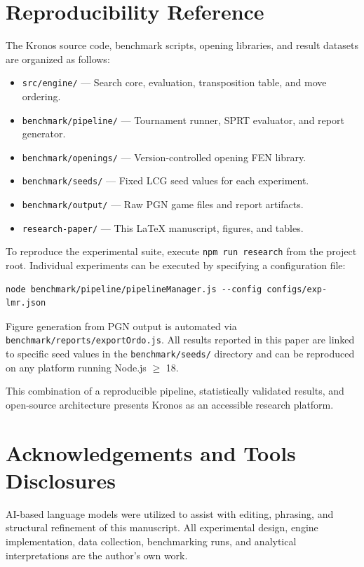 \section{Reproducibility Reference}
The Kronos source code, benchmark scripts, opening libraries, and result datasets are organized as follows:
\begin{itemize}
    \item \texttt{src/engine/} — Search core, evaluation, transposition table, and move ordering.
    \item \texttt{benchmark/pipeline/} — Tournament runner, SPRT evaluator, and report generator.
    \item \texttt{benchmark/openings/} — Version-controlled opening FEN library.
    \item \texttt{benchmark/seeds/} — Fixed LCG seed values for each experiment.
    \item \texttt{benchmark/output/} — Raw PGN game files and report artifacts.
    \item \texttt{research-paper/} — This \LaTeX{} manuscript, figures, and tables.
\end{itemize}

To reproduce the experimental suite, execute \texttt{npm run research} from the project root. Individual experiments can be executed by specifying a configuration file:
\begin{verbatim}
node benchmark/pipeline/pipelineManager.js --config configs/exp-lmr.json
\end{verbatim}
Figure generation from PGN output is automated via \texttt{benchmark/reports/exportOrdo.js}. All results reported in this paper are linked to specific seed values in the \texttt{benchmark/seeds/} directory and can be reproduced on any platform running Node.js $\geq$ 18.


This combination of a reproducible pipeline, statistically validated results, and open-source architecture presents Kronos as an accessible research platform.

\section{Acknowledgements and Tools Disclosures}
AI-based language models were utilized to assist with editing, phrasing, and structural refinement of this manuscript. All experimental design, engine implementation, data collection, benchmarking runs, and analytical interpretations are the author's own work.

